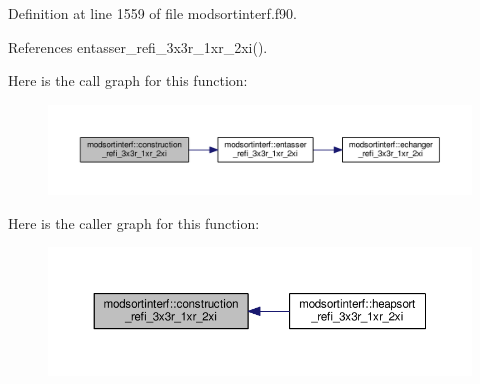 Definition at line 1559 of file modsortinterf.\+f90.



References entasser\+\_\+refi\+\_\+3x3r\+\_\+1xr\+\_\+2xi().



Here is the call graph for this function\+:\nopagebreak
\begin{figure}[H]
\begin{center}
\leavevmode
\includegraphics[width=350pt]{namespacemodsortinterf_a8a63b4674b7d0bad760142680729439c_cgraph}
\end{center}
\end{figure}




Here is the caller graph for this function\+:\nopagebreak
\begin{figure}[H]
\begin{center}
\leavevmode
\includegraphics[width=350pt]{namespacemodsortinterf_a8a63b4674b7d0bad760142680729439c_icgraph}
\end{center}
\end{figure}


